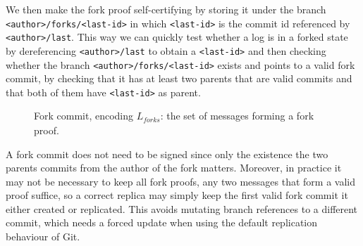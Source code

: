 \documentclass[9pt, oneside]{article}   	%
\begin{document}
We then make the fork proof self-certifying by storing it under the branch \texttt{<author>/forks/<last-id>} in which \texttt{<last-id>} is the commit id  referenced by \texttt{<author>/last}.  This way we can quickly test whether a log is in a forked state by dereferencing \texttt{<author>/last} to obtain a \texttt{<last-id>} and then checking whether the branch \texttt{<author>/forks/<last-id>} exists and points to a valid fork commit, by checking that it has at least two parents that are valid commits and that both of them have \texttt{<last-id>} as parent.

\begin{table}[ht]
\caption{Encoding of fork proofs as Git commits.}
\label{tb:git-fork-commit}
\end{table}

\begin{figure}
\label{fig:fork-commit}
\caption{Fork commit, encoding $L_\textit{forks}$: the set of messages forming a fork proof.}
\end{figure}

A fork commit does not need to be signed since only the existence the two parents commits from the author of the fork matters. Moreover, in practice it may not be necessary to keep all fork proofs, any two messages that form a valid proof suffice, so a correct replica may simply keep the first valid fork commit it either created or replicated. This avoids mutating branch references to a different commit, which needs a forced update when using the default replication behaviour of Git. 
\end{document}
